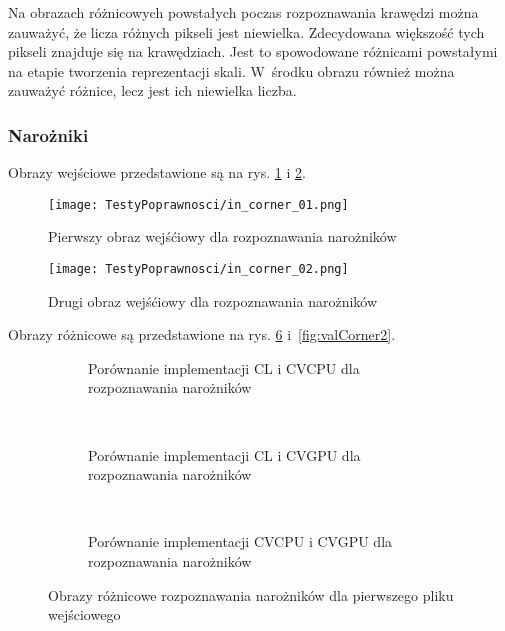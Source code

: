 Na obrazach różnicowych powstałych poczas rozpoznawania krawędzi można zauważyć, że licza różnych pikseli jest niewielka. Zdecydowana większość tych pikseli znajduje się na krawędziach. Jest to spowodowane różnicami powstałymi na etapie tworzenia reprezentacji skali. W~środku obrazu również można zauważyć różnice, lecz jest ich niewielka liczba.

\subsubsection{Narożniki}
\label{subsubsec:naroznikiRysunki}

Obrazy wejściowe przedstawione są na rys. \ref{fig:valCorner01} i \ref{fig:valCorner02}.

\begin{figure}
\begin{center}
\texttt{[image: TestyPoprawnosci/in\_corner\_01.png]}
\end{center}
\caption{Pierwszy obraz wejśćiowy dla rozpoznawania narożników}
\label{fig:valCorner01}
\end{figure}

\begin{figure}
\begin{center}
\texttt{[image: TestyPoprawnosci/in\_corner\_02.png]}
\end{center}
\caption{Drugi obraz wejśćiowy dla rozpoznawania narożników}
\label{fig:valCorner02}
\end{figure}

Obrazy różnicowe są przedstawione na rys. \ref{fig:valCorner1} i~\ref{fig:valCorner2}. 

\begin{figure}
\begin{subfigure}[t]{0.3\textwidth}
	\centering
	\setlength\fboxsep{0pt}
	\setlength\fboxrule{0.5pt}
	\caption{Porównanie implementacji CL i CVCPU dla rozpoznawania narożników}
	\label{fig:valCorner1CLCVCPU}
\end{subfigure}
~
\begin{subfigure}[t]{0.3\textwidth}
	\centering
	\setlength\fboxsep{0pt}
	\setlength\fboxrule{0.5pt}
	\caption{Porównanie implementacji CL i CVGPU dla rozpoznawania narożników}
	\label{fig:valCorner1CLCVGPU}
\end{subfigure}
~
\begin{subfigure}[t]{0.3\textwidth}
	\centering
	\setlength\fboxsep{0pt}
	\setlength\fboxrule{0.5pt}
	\caption{Porównanie implementacji CVCPU i CVGPU dla rozpoznawania narożników}
	\label{fig:valCorner1CVCPUCVGPU}                 
\end{subfigure}
\caption{Obrazy różnicowe rozpoznawania narożników dla pierwszego pliku wejściowego}
\label{lena_scales}
\label{fig:valCorner1}
\end{figure}

